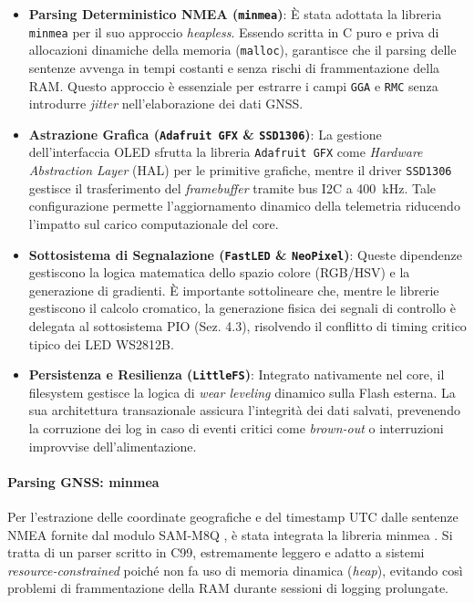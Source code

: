 \begin{itemize}
    \item \textbf{Parsing Deterministico NMEA (\texttt{minmea})}: È stata adottata la libreria \texttt{minmea} per il suo approccio \textit{heapless}. Essendo scritta in C puro e priva di allocazioni dinamiche della memoria (\texttt{malloc}), garantisce che il parsing delle sentenze avvenga in tempi costanti e senza rischi di frammentazione della RAM. Questo approccio è essenziale per estrarre i campi \texttt{GGA} e \texttt{RMC} senza introdurre \textit{jitter} nell'elaborazione dei dati GNSS.
    
    \item \textbf{Astrazione Grafica (\texttt{Adafruit GFX} \& \texttt{SSD1306})}: La gestione dell'interfaccia OLED sfrutta la libreria \texttt{Adafruit GFX} come \textit{Hardware Abstraction Layer} (HAL) per le primitive grafiche, mentre il driver \texttt{SSD1306} gestisce il trasferimento del \textit{framebuffer} tramite bus I2C a \qty{400}{kHz}. Tale configurazione permette l'aggiornamento dinamico della telemetria riducendo l'impatto sul carico computazionale del core.

    \item \textbf{Sottosistema di Segnalazione (\texttt{FastLED} \& \texttt{NeoPixel})}: Queste dipendenze gestiscono la logica matematica dello spazio colore (RGB/HSV) e la generazione di gradienti. È importante sottolineare che, mentre le librerie gestiscono il calcolo cromatico, la generazione fisica dei segnali di controllo è delegata al sottosistema PIO (Sez. 4.3), risolvendo il conflitto di timing critico tipico dei LED WS2812B.

    \item \textbf{Persistenza e Resilienza (\texttt{LittleFS})}: Integrato nativamente nel core, il filesystem gestisce la logica di \textit{wear leveling} dinamico sulla Flash esterna. La sua architettura transazionale assicura l'integrità dei dati salvati, prevenendo la corruzione dei log in caso di eventi critici come \textit{brown-out} o interruzioni improvvise dell'alimentazione.
\end{itemize}


\paragraph{Parsing GNSS: minmea}

Per l'estrazione delle coordinate geografiche e del timestamp UTC dalle sentenze NMEA fornite dal modulo SAM-M8Q \cite{sam_m8q_ds}, è stata integrata la libreria minmea \cite{minmea_lib}. Si tratta di un parser scritto in C99, estremamente leggero e adatto a sistemi \textit{resource-constrained} poiché non fa uso di memoria dinamica (\textit{heap}), evitando così problemi di frammentazione della RAM durante sessioni di logging prolungate.




